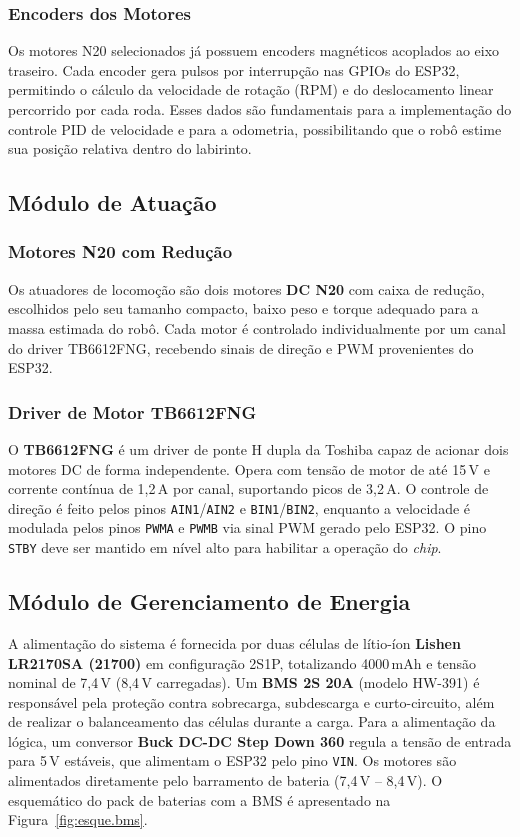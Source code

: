 \subsubsection{Encoders dos Motores}

Os motores N20 selecionados já possuem encoders magnéticos acoplados ao eixo traseiro.
Cada encoder gera pulsos por interrupção nas GPIOs do ESP32, permitindo o cálculo da velocidade
de rotação (RPM) e do deslocamento linear percorrido por cada roda. Esses dados são fundamentais
para a implementação do controle PID de velocidade e para a odometria, possibilitando que o
robô estime sua posição relativa dentro do labirinto.

\subsection{Módulo de Atuação}

\subsubsection{Motores N20 com Redução}

Os atuadores de locomoção são dois motores \textbf{DC N20} com caixa de redução, escolhidos
pelo seu tamanho compacto, baixo peso e torque adequado para a massa estimada do robô. Cada
motor é controlado individualmente por um canal do driver TB6612FNG, recebendo sinais de
direção e PWM provenientes do ESP32.

\subsubsection{Driver de Motor TB6612FNG}

O \textbf{TB6612FNG} é um driver de ponte H dupla da Toshiba capaz de acionar dois motores DC
de forma independente. Opera com tensão de motor de até 15\,V e corrente contínua de 1,2\,A
por canal, suportando picos de 3,2\,A. O controle de direção é feito pelos pinos
\texttt{AIN1}/\texttt{AIN2} e \texttt{BIN1}/\texttt{BIN2}, enquanto a velocidade é modulada
pelos pinos \texttt{PWMA} e \texttt{PWMB} via sinal PWM gerado pelo ESP32. O pino \texttt{STBY}
deve ser mantido em nível alto para habilitar a operação do \textit{chip}.

\subsection{Módulo de Gerenciamento de Energia}

A alimentação do sistema é fornecida por duas células de lítio-íon \textbf{Lishen LR2170SA
(21700)} em configuração 2S1P, totalizando 4000\,mAh e tensão nominal de 7,4\,V (8,4\,V
carregadas). Um \textbf{BMS 2S 20A} (modelo HW-391) é responsável pela proteção contra
sobrecarga, subdescarga e curto-circuito, além de realizar o balanceamento das células durante
a carga. Para a alimentação da lógica, um conversor \textbf{Buck DC-DC Step Down 360} regula
a tensão de entrada para 5\,V estáveis, que alimentam o ESP32 pelo pino \texttt{VIN}. Os
motores são alimentados diretamente pelo barramento de bateria (7,4\,V -- 8,4\,V). O
esquemático do pack de baterias com a BMS é apresentado na Figura~\ref{fig:esque.bms}.

